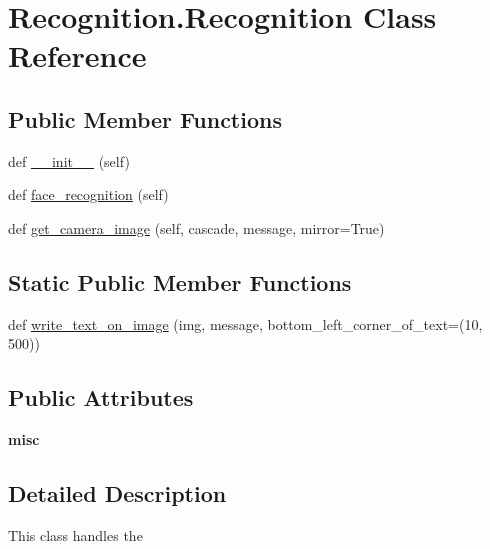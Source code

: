 \hypertarget{class_recognition_1_1_recognition}{}\section{Recognition.\+Recognition Class Reference}
\label{class_recognition_1_1_recognition}
\subsection*{Public Member Functions}
\begin{DoxyCompactItemize}
\item 
def \mbox{\hyperlink{class_recognition_1_1_recognition_a2f7707bf1fc057ae30c41baefbd7bf38}{\+\_\+\+\_\+init\+\_\+\+\_\+}} (self)
\item 
def \mbox{\hyperlink{class_recognition_1_1_recognition_a8c3d9ab0e9c708246660b8a6300eb852}{face\+\_\+recognition}} (self)
\item 
def \mbox{\hyperlink{class_recognition_1_1_recognition_a8d0901488f10a3806c8ebbdff92043b3}{get\+\_\+camera\+\_\+image}} (self, cascade, message, mirror=True)
\end{DoxyCompactItemize}
\subsection*{Static Public Member Functions}
\begin{DoxyCompactItemize}
\item 
def \mbox{\hyperlink{class_recognition_1_1_recognition_a5b3081b9a48c136f1397cd17dce89c37}{write\+\_\+text\+\_\+on\+\_\+image}} (img, message, bottom\+\_\+left\+\_\+corner\+\_\+of\+\_\+text=(10, 500))
\end{DoxyCompactItemize}
\subsection*{Public Attributes}
\begin{DoxyCompactItemize}
\item 
\mbox{\label{class_recognition_1_1_recognition_a6b6d17e10f916f8a158eaef600005bbc}} 
{\bfseries misc}
\end{DoxyCompactItemize}


\subsection{Detailed Description}
\begin{DoxyVerb}This class handles the
\end{DoxyVerb}
 

